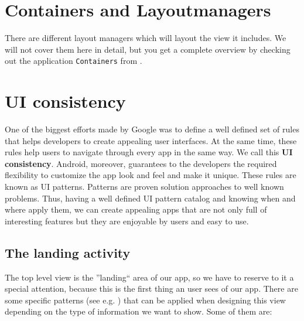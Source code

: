 \section{Containers and Layoutmanagers}
There are different layout managers which will layout the view it includes. We will not cover them here in detail, but you get a complete overview by checking out the application \texttt{Containers} from \cite{murphymarkl.2017}.




\section{UI consistency}
One of the biggest efforts made by Google was to define a well defined set of rules that helps developers to create appealing user
interfaces. At the same time, these rules help users to navigate through every app in the same way. We call this\textbf{ UI consistency}.
Android, moreover, guarantees to the developers the required flexibility to customize the app look and feel and make it unique.
These rules are known as UI patterns. Patterns are proven solution approaches to well known problems. Thus, having a well
defined UI pattern catalog and knowing when and where apply them, we can create appealing apps that are not only full of
interesting features but they are enjoyable by users and easy to use.

\subsection{The landing activity}
The top level view is the ''landing`` area of our app, so we have to reserve to it a special attention, because this is the first
thing an user sees of our app. There are some specific patterns (see e.g. \cite{Google2017c}) that can be applied when designing this view depending on the type of information we want to show. Some of them are:

